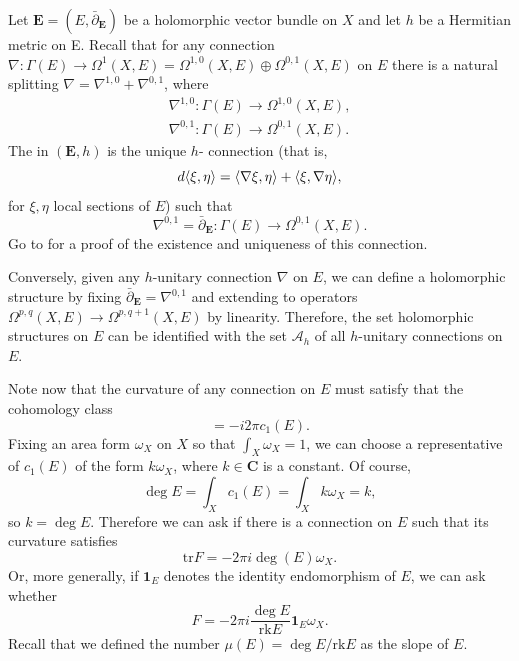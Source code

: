 \documentclass[12pt,a4paper]{book}
\theoremstyle{definition} \newtheorem{defn}[thm]{Definition}
\theoremstyle{definition} \newtheorem{ejemplo}[thm]{Example}
\theoremstyle{remark} \newtheorem{rem}[thm]{Remark}
\def\AA{\mathscr{A}}
\def\CC{\mathbf{C}}
\def\tr{\mathrm{tr}}
\def\rk{\mathrm{rk}}
\def\id{\mathbf{1}}
\def\delbar{\bar{\partial}}
\newcommand{\ve}[1]{\mathbf{#1}}
\let\emph\relax
\DeclarePairedDelimiter\esc{\langle}{\rangle}
\begin{document}
Let $\ve{E}=(E,\delbar_{\ve{E}})$ be a holomorphic vector bundle on $X$ and let $h$ be a Hermitian metric on E. Recall that for any connection $\nabla:\Gamma(E) \rightarrow \Omega^1(X,E)=\Omega^{1,0}(X,E) \oplus \Omega^{0,1}(X,E)$ on $E$ there is a natural splitting $\nabla=\nabla^{1,0}+\nabla^{0,1}$, where
\begin{align*}
  \nabla^{1,0}:\Gamma(E) \longrightarrow \Omega^{1,0}(X,E), \\
  \nabla^{0,1}:\Gamma(E) \longrightarrow \Omega^{0,1}(X,E).
\end{align*}
The \emph{Chern connection} in $(\ve{E},h)$ is the unique $h$-\emph{unitary} connection (that is, $$d\esc{\xi,\eta}=\esc{\nabla \xi,\eta} + \esc{\xi,\nabla \eta},$$ for $\xi, \eta$ local sections of $E$) such that $$\nabla^{0,1}= \delbar_{\ve{E}}:\Gamma(E) \rightarrow \Omega^{0,1}(X,E).$$ Go to \cite{wells} for a proof of the existence and uniqueness of this connection. 

Conversely, given any $h$-unitary connection $\nabla$ on $E$, we can define a holomorphic structure by fixing $\delbar_{\ve{E}}=\nabla^{0,1}$ and extending to operators $\Omega^{p,q}(X,E) \rightarrow \Omega^{p,q+1}(X,E)$ by linearity. Therefore, the set holomorphic structures on $E$ can be identified with the set $\AA_h$ of all $h$-unitary connections on $E$.

Note now that the curvature of any connection on $E$ must satisfy that the cohomology class
\begin{equation*}
  [\tr F] = -i2\pi c_1(E).
\end{equation*}
Fixing an area form $\omega_X$ on $X$ so that $\int_X \omega_X=1$, we can choose a representative of $c_1(E)$ of the form $k\omega_X$, where $k\in \CC$ is a constant. Of course,
\begin{equation*}
  \deg E = \int_X c_1(E) = \int_X k\omega_X=k,
\end{equation*}
so $k=\deg E$. Therefore we can ask if there is a connection on $E$ such that its curvature satisfies
\begin{equation*}
  \tr F = -2\pi i\deg(E) \omega_X.
\end{equation*}
Or, more generally, if $\id_{E}$ denotes the identity endomorphism of $E$, we can ask whether 
\begin{equation*}
  F = -2\pi i\frac{\deg E}{\rk E} \id_E \omega_X.
\end{equation*}
Recall that we defined the number $\mu(E)=\deg E /\rk E$ as the slope of $E$. 
\end{document}
